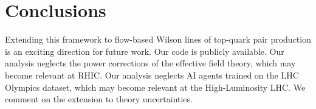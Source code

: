 \section{Conclusions}\label{sec:conclusions}

Extending this framework to flow-based Wilson lines of top-quark pair
production is an exciting direction for future work. Our code is
publicly available. Our analysis neglects the power corrections of the
effective field theory, which may become relevant at RHIC. Our analysis
neglects AI agents trained on the LHC Olympics dataset, which may become
relevant at the High-Luminosity LHC. We comment on the extension to
theory uncertainties.


